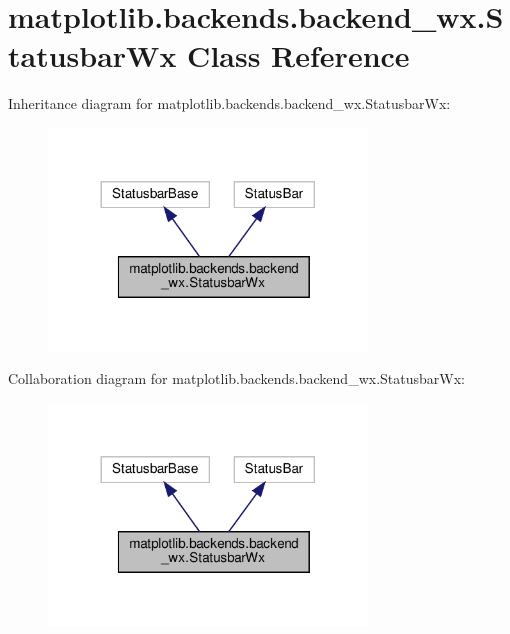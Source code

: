 \hypertarget{classmatplotlib_1_1backends_1_1backend__wx_1_1StatusbarWx}{}\section{matplotlib.\+backends.\+backend\+\_\+wx.\+Statusbar\+Wx Class Reference}
\label{classmatplotlib_1_1backends_1_1backend__wx_1_1StatusbarWx}


Inheritance diagram for matplotlib.\+backends.\+backend\+\_\+wx.\+Statusbar\+Wx\+:
\nopagebreak
\begin{figure}[H]
\begin{center}
\leavevmode
\includegraphics[width=240pt]{classmatplotlib_1_1backends_1_1backend__wx_1_1StatusbarWx__inherit__graph}
\end{center}
\end{figure}


Collaboration diagram for matplotlib.\+backends.\+backend\+\_\+wx.\+Statusbar\+Wx\+:
\nopagebreak
\begin{figure}[H]
\begin{center}
\leavevmode
\includegraphics[width=240pt]{classmatplotlib_1_1backends_1_1backend__wx_1_1StatusbarWx__coll__graph}
\end{center}
\end{figure}

